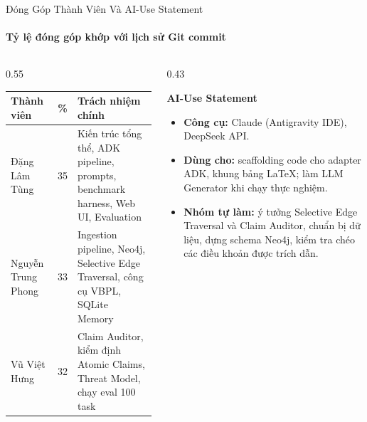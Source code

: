 \documentclass[aspectratio=1610,10pt,xcolor={table}]{beamer}
\begin{document}
\begin{frame}{Đóng Góp Thành Viên Và AI-Use Statement}
  \framesubtitle{Tỷ lệ đóng góp khớp với lịch sử Git commit}

  \begin{columns}[t]
    \begin{column}{0.55\textwidth}
      \footnotesize
      \begin{tabularx}{\linewidth}{@{}l c >{\raggedright\arraybackslash}X@{}}
        \toprule
        \textbf{Thành viên} & \textbf{\%} & \textbf{Trách nhiệm chính} \\
        \midrule
        Đặng Lâm Tùng & 35 & Kiến trúc tổng thể, ADK pipeline, prompts, benchmark harness, Web UI, Evaluation \\
        Nguyễn Trung Phong & 33 & Ingestion pipeline, Neo4j, Selective Edge Traversal, công cụ VBPL, SQLite Memory \\
        Vũ Việt Hưng & 32 & Claim Auditor, kiểm định Atomic Claims, Threat Model, chạy eval 100 task \\
        \bottomrule
      \end{tabularx}
    \end{column}

    \begin{column}{0.43\textwidth}
      \begin{block}{\textbf{AI-Use Statement}}
        \begin{itemize}\footnotesize
          \item \textbf{Công cụ:} Claude (Antigravity IDE), DeepSeek API.
          \item \textbf{Dùng cho:} scaffolding code cho adapter ADK, khung bảng LaTeX;  làm LLM Generator khi chạy thực nghiệm.
          \item \textbf{Nhóm tự làm:} ý tưởng Selective Edge Traversal và Claim Auditor, chuẩn bị dữ liệu, dựng schema Neo4j, kiểm tra chéo các điều khoản được trích dẫn.
        \end{itemize}
      \end{block}
    \end{column}
  \end{columns}
\end{frame}
\end{document}
